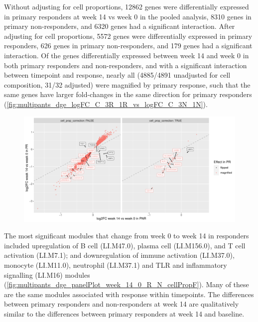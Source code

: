 \begin{outline}
Without adjusting for cell proportions,
12862 genes were differentially expressed in primary responders at week 14 vs week 0 in the pooled analysis,
8310 genes in primary non-responders,
and 6320 genes had a significant interaction.
After adjusting for cell proportions, 
5572 genes were differentially expressed in primary responders,
626 genes in primary non-responders,
and 179 genes had a significant interaction.
Of the genes differentially expressed between week 14 and week 0 in both primary responders and non-responders,
and with a significant interaction between timepoint and response, 
nearly all (4885/4891 unadjusted for cell composition, 31/32 adjusted) were magnified by primary response,
such that the same genes have larger fold-changes in the same direction for primary responders (\autoref{fig:multipants_dge_logFC_C_3R_1R_vs_logFC_C_3N_1N}).

\begin{figure}
    \centering
    \includegraphics[width=1.0\textwidth,page=1]{mainmatter/figures/chapter_04/plot_gene_set_enrichment.logFC_C_3R_1R_vs_logFC_C_3N_1N.pdf}
    \caption{}
    \label{fig:multipants_dge_logFC_C_3R_1R_vs_logFC_C_3N_1N}
\end{figure}

The most significant modules that change from week 0 to week 14 in responders included
upregulation of B cell (LI.M47.0), plasma cell (LI.M156.0), and T cell activation (LI.M7.1);
and downregulation of immune activation (LI.M37.0), monocyte (LI.M11.0), neutrophil (LI.M37.1) and TLR and inflammatory signalling (LI.M16) modules (\autoref{fig:multipants_dge_panelPlot_week_14_0_R_N_cellPropF}).
Many of these are the same modules associated with response within timepoints.
The differences between primary responders and non-responders at week 14 are qualitatively similar to the differences between primary responders at week 14 and baseline.


\end{outline}
